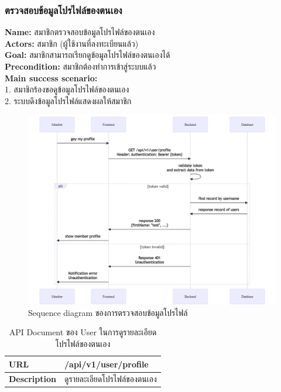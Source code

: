\documentclass[12pt,oneside,openright,a4paper]{cpe-thai-project}
\begin{document}
\begin{itemize}
\subsubsection{ตรวจสอบข้อมูลโปรไฟล์ของตนเอง}
\textbf{Name: }สมาชิกตรวจสอบข้อมูลโปรไฟล์ของตนเอง \\
\textbf{Actors: }สมาชิก (ผู้ใช้งานที่ลงทะเบียนแล้ว) \\
\textbf{Goal: }สมาชิกสามารถเรียกดูข้อมูลโปรไฟล์ของตนเองได้ \\
\textbf{Precondition: }สมาชิกต้องทำการเข้าสู่ระบบแล้ว \\
\textbf{Main success scenario: } \\
  \hspace*{0.5cm}1. สมาชิกร้องขอดูข้อมูลโปรไฟล์ของตนเอง  \\
  \hspace*{0.5cm}2. ระบบดึงข้อมูลโปรไฟล์แสดงผลให้สมาชิก \\ \newpage 
\begin{figure}[!ht]\centering
  \includegraphics[width=\textwidth]{./img/seq_profile.png}
  \caption{Sequence diagram ของการตรวจสอบข้อมูลโปรไฟล์}\label{fig:seq_profile} 
\end{figure} 
\begin{longtable}[!ht]{p{3cm}|p{8cm}}
  \caption{API Document ของ User ในการดูรายละเอียดโปรไฟล์ของตนเอง}\label{tbl:api_user_profile} 
    \endfirsthead
    \endhead
    \hhline{==}
    \textbf{URL}              & /api/v1/user/profile                                                                                               \\ \hline
    \textbf{Description}      & ดูรายละเอียดโปรไฟล์ของตนเอง                                                                                            \\ \hline

\end{longtable}
\end{itemize}
\end{document}
